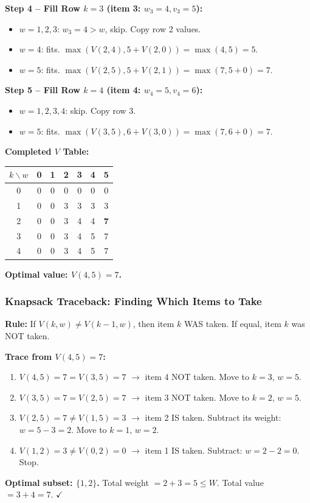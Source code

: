 \documentclass[12pt,portrait]{article}
\begin{document}
\textbf{Step 4 -- Fill Row $k=3$ (item 3: $w_3=4, v_3=5$):}
\begin{itemize}[leftmargin=*]
    \item $w=1,2,3$: $w_3=4 > w$, skip. Copy row 2 values.
    \item $w=4$: fits. $\max(V(2,4), 5+V(2,0)) = \max(4, 5) = 5$.
    \item $w=5$: fits. $\max(V(2,5), 5+V(2,1)) = \max(7, 5+0) = 7$.
\end{itemize}

\textbf{Step 5 -- Fill Row $k=4$ (item 4: $w_4=5, v_4=6$):}
\begin{itemize}[leftmargin=*]
    \item $w=1,2,3,4$: skip. Copy row 3.
    \item $w=5$: fits. $\max(V(3,5), 6+V(3,0)) = \max(7, 6+0) = 7$.
\end{itemize}

\textbf{Completed $V$ Table:}

\begin{center}
\begin{tabular}{c|c|c|c|c|c|c}
\toprule
$k \backslash w$ & 0 & 1 & 2 & 3 & 4 & 5 \\
\midrule
0 & 0 & 0 & 0 & 0 & 0 & 0 \\
1 & 0 & 0 & 3 & 3 & 3 & 3 \\
2 & 0 & 0 & 3 & 4 & 4 & \textbf{7} \\
3 & 0 & 0 & 3 & 4 & 5 & 7 \\
4 & 0 & 0 & 3 & 4 & 5 & 7 \\
\bottomrule
\end{tabular}
\end{center}

\textbf{Optimal value: $V(4,5) = 7$.}

\subsubsection{Knapsack Traceback: Finding Which Items to Take}

\begin{rulebox}
\textbf{Rule:} If $V(k,w) \neq V(k-1,w)$, then item $k$ WAS taken. If equal, item $k$ was NOT taken.

\textbf{Trace from $V(4,5)=7$:}
\begin{enumerate}[leftmargin=*]
    \item $V(4,5)=7 = V(3,5)=7$ $\to$ item 4 NOT taken. Move to $k=3$, $w=5$.
    \item $V(3,5)=7 = V(2,5)=7$ $\to$ item 3 NOT taken. Move to $k=2$, $w=5$.
    \item $V(2,5)=7 \neq V(1,5)=3$ $\to$ item 2 IS taken. Subtract its weight: $w = 5-3 = 2$. Move to $k=1$, $w=2$.
    \item $V(1,2)=3 \neq V(0,2)=0$ $\to$ item 1 IS taken. Subtract: $w = 2-2 = 0$. Stop.
\end{enumerate}

\textbf{Optimal subset: $\{1, 2\}$.} Total weight $= 2+3=5 \leq W$. Total value $= 3+4=7$. $\checkmark$
\end{rulebox}
\end{document}
